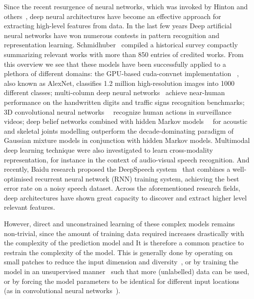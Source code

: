 Since the recent resurgence of neural networks, which was invoked by Hinton and others~\cite{hinton2006fast},
deep neural architectures have become an effective approach for extracting high-level features from data.
In the last few years Deep artificial neural networks have won numerous contests in pattern recognition and representation learning.
Schmidhuber~\cite{schmidhuber2014deep} compiled a historical survey compactly summarizing relevant works with more than 850 entries of credited works.
From this overview we see that these models have been successfully applied to a plethora of different domains: the GPU-based cuda-convnet implementation~\cite{krizhevsky2012imagenet} , also known as AlexNet, classifies 1.2 million high-resolution images into 1000 different classes; multi-column deep neural networks~\cite{ciresan2012multi} achieve near-human performance on the handwritten digits and traffic signs recognition benchmarks; 3D convolutional neural networks~\cite{3dcnn}~\cite{ji20133d} recognize human actions in surveillance videos; deep belief networks combined with hidden Markov models~\cite{mohamed2012acoustic}~\cite{diwucvpr14} for acoustic and skeletal joints modelling outperform the decade-dominating paradigm of Gaussian mixture models in conjunction with hidden Markov models.
%
Multimodal deep learning technique were also investigated \cite{Ngiam2011multimodal} to learn cross-modality representation,
for instance in the context of audio-visual speech recognition.
%
And recently, Baidu research proposed the DeepSpeech system~\cite{hannun2014deepspeech} that combines a well-optimised recurrent neural network (RNN) training system, achieving the best error rate on a noisy speech dataset. Across the aforementioned research fields, deep architectures have shown great capacity to discover and extract higher level relevant features.

However, direct and unconstrained learning of these complex models remains non-trivial, since the amount of  training data required increases drastically with the complexity of the prediction model and %
It is therefore a common practice to restrain the complexity of the model. This is generally done by operating on small patches to reduce the input dimension and diversity~\cite{baccouche2005spatio}, or by training the model in an unsupervised manner~\cite{le2011learning} such that more (unlabelled) data can be used, or by forcing the model parameters to be identical for different input locations (as in convolutional neural networks~\cite{krizhevsky2012imagenet,ciresan2012multi,3dcnn}).


